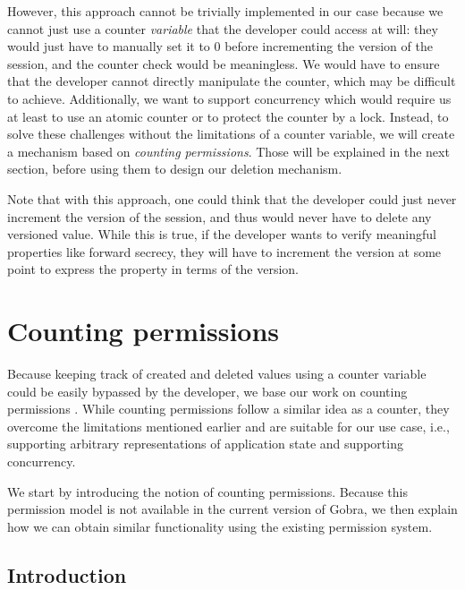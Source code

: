 However, this approach cannot be trivially implemented in our case because we cannot just use a counter \emph{variable} that the developer could access at will: they would just have to manually set it to $0$ before incrementing the version of the session, and the counter check would be meaningless.
We would have to ensure that the developer cannot directly manipulate the counter, which may be difficult to achieve.
Additionally, we want to support concurrency which would require us at least to use an atomic counter or to protect the counter by a lock.
Instead, to solve these challenges without the limitations of a counter variable, we will create a mechanism based on \emph{counting permissions}. Those will be explained in the next section, before using them to design our deletion mechanism.

Note that with this approach, one could think that the developer could just never increment the version of the session, and thus would never have to delete any versioned value. While this is true, if the developer wants to verify meaningful properties like forward secrecy, they will have to increment the version at some point to express the property in terms of the version.

\section{Counting permissions}
\label{sec:counting-permissions}

Because keeping track of created and deleted values using a counter variable could be easily bypassed by the developer, we base our work on counting permissions \cite{}.
While counting permissions follow a similar idea as a counter, they overcome the limitations mentioned earlier and are suitable for our use case, i.e., supporting arbitrary representations of application state and supporting concurrency.

We start by introducing the notion of counting permissions.
Because this permission model is not available in the current version of Gobra, we then explain how we can obtain similar functionality using the existing permission system.

\subsection{Introduction}
\label{sec:counting-permissions-introduction}

